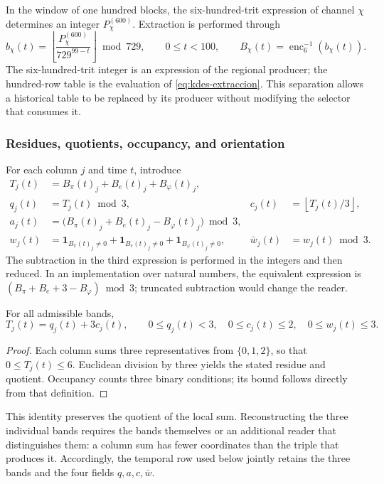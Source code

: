 In the window of one hundred blocks, the six-hundred-trit expression of channel $\chi$ determines an integer $P_\chi^{(600)}$. Extraction is performed through
\begin{equation}
 b_\chi(t)=
 \left\lfloor\frac{P_\chi^{(600)}}{729^{99-t}}\right\rfloor\bmod729,
 \qquad 0\leq t<100,
 \qquad B_\chi(t)=\operatorname{enc}_6^{-1}(b_\chi(t)).
 \label{eq:kdes-extraccion}
\end{equation}
The six-hundred-trit integer is an expression of the regional producer; the hundred-row table is the evaluation of \eqref{eq:kdes-extraccion}. This separation allows a historical table to be replaced by its producer without modifying the selector that consumes it.

\subsubsection{Residues, quotients, occupancy, and orientation}

For each column $j$ and time $t$, introduce
\begin{align}
 T_j(t)&=B_\pi(t)_j+B_e(t)_j+B_\varphi(t)_j,\\
 q_j(t)&=T_j(t)\bmod3,
 &c_j(t)&=\left\lfloor T_j(t)/3\right\rfloor,\\
 a_j(t)&=\bigl(B_\pi(t)_j+B_e(t)_j-B_\varphi(t)_j\bigr)\bmod3,\\
 w_j(t)&=\mathbf1_{B_\pi(t)_j\ne0}
       +\mathbf1_{B_e(t)_j\ne0}
       +\mathbf1_{B_\varphi(t)_j\ne0},
 &\bar w_j(t)&=w_j(t)\bmod3.
 \label{eq:kdes-firmas}
\end{align}
The subtraction in the third expression is performed in the integers and
then reduced. In an implementation over natural numbers, the equivalent expression
is $(B_\pi+B_e+3-B_\varphi)\bmod3$; truncated subtraction would change the reader.

\begin{proposition}
For all admissible bands,
\[
 T_j(t)=q_j(t)+3c_j(t),\qquad
 0\leq q_j(t)<3,\quad 0\leq c_j(t)\leq2,
 \quad0\leq w_j(t)\leq3.
\]
\end{proposition}
\begin{proof}
Each column sums three representatives from $\{0,1,2\}$, so that
$0\leq T_j(t)\leq6$. Euclidean division by three yields the stated residue
and quotient. Occupancy counts three binary conditions;
its bound follows directly from that definition.
\end{proof}

This identity preserves the quotient of the local sum. Reconstructing
the three individual bands requires the bands themselves or an additional reader
that distinguishes them: a column sum has fewer coordinates
than the triple that produces it. Accordingly, the temporal row used below
jointly retains the three bands and the four fields
$q,a,c,\bar w$.


